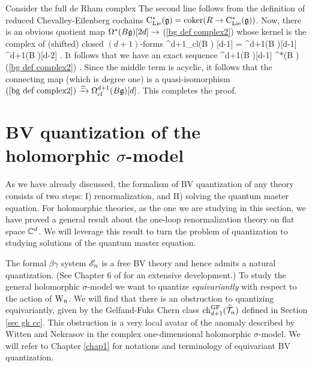 \documentclass[10pt]{amsart}
\def\brian{\textcolor{blue}{BW: }\textcolor{blue}}
\begin{document}
Consider the full de Rham complex 
\ben
{}
\een
The second line follows from the definition of reduced Chevalley-Eilenberg cochains ${\rm C}_{{\rm Lie}}^*(\mathfrak g) = {\rm coker}(R \to {\rm C}_{{\rm Lie}}^*(\mathfrak g))$.
Now, there is an obvious quotient map $\Omega^*(B \mathfrak g)[2d] \to$ (\ref{bg def complex2}) whose kernel is the complex of (shifted) closed $(d+1)$-forms
\ben
\Omega^{d+1}_{cl}(B \fg) [d-1] = \Omega^{d+1}(B \fg)[d-1] \xto{\partial} \Omega^{d+1}(B \fg)[d-2] \to \cdots .
\een
It follows that we have an exact sequence 
\ben
\Omega^{d+1}(B \fg)[d-1] \to \Omega^*(B \fg) \to (\ref{bg def complex2}) .
\een 
Since the middle term is acyclic, it follows that the connecting map (which is degree one) is a quasi-isomorphism $(\ref{bg def complex2}) \xrightarrow{\simeq} \Omega^{d+1}_{cl} (B \mathfrak g) [d]$. 
This completes the proof.

%
%

\section{BV quantization of the holomorphic $\sigma$-model}

As we have already discussed, the formalism of BV quantization of any theory consists of two steps: I) renormalization, and II) solving the quantum master equation. 
For holomorphic theories, as the one we are studying in this section, we have proved a general result about the one-loop renormalization theory on flat space $\mathbb C^d$. 
We will leverage this result to turn the problem of quantization to studying solutions of the quantum master equation.

The formal $\beta\gamma$ system $\mathscr E_n$ is a free BV theory and hence admits a natural quantization.
(See Chapter 6 of \cite{GwThesis} for an extensive development.)  
To study the general holomorphic $\sigma$-model we want to quantize \emph{equivariantly} with respect to the action of ${{\rm W}_n}$.
We will find that there is an obstruction to quantizing equivariantly, 
given by the Gelfand-Fuks Chern class ${\rm ch}_{d+1}^{{\rm GF}}(\widehat{\mathcal T}_n)$ defined in Section \ref{sec gk cc}. 
This obstruction is a very local avatar of the anomaly described by Witten and Nekrasov \cite{WittenCDO,Nek} in the complex one-dimensional holomorphic $\sigma$-model.
We will refer to Chapter \ref{chap1} for notations and terminology of equivariant BV quantization.
\end{document}
